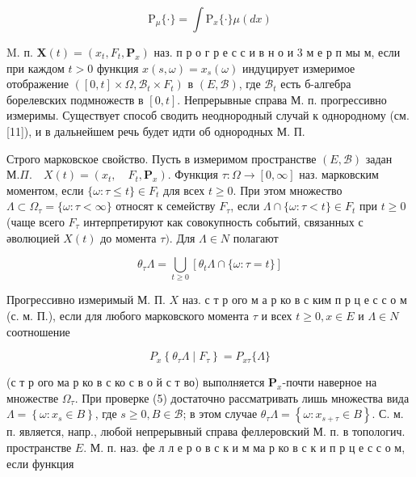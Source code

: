 \documentclass[10pt]{article}
\begin{document}
\[

\mathrm{P}_{\mu}\{\cdot\}=\int \mathrm{P}_{x}\{\cdot\} \mu(d x)

\]



M. п. $\boldsymbol{X}(t)=\left(x_{t}, F_{t}, \mathbf{P}_{x}\right)$ наз. п р о г р е с с и в н о и 3 м е р п мы м, если при каждом $t>0$ функция $x(s, \omega)=x_{s}(\omega)$ индуцирует измеримое отображение $\left([0, t] \times \Omega, \mathscr{B}_{t} \times F_{t}\right)$ в $(E, \mathscr{B})$, где $\mathscr{B}_{t}$ есть б-алгебра борелевских подмножеств в $[0, t]$. Непрерывные справа М. п. прогрессивно измеримы. Существует способ сводить неоднородный случай к однородному (см. [11]), и в дальнейшем речь будет идти об однородных М. П.



Строго марковское свойство. Пусть в измеримом пространстве $(E, \mathscr{B})$ задан $М . \Pi . \quad X(t)=\left(x_{t}, \quad F_{t}, \mathbf{P}_{x}\right)$. Функция $\tau: \Omega \rightarrow[0, \infty]$ наз. марковским моментом, если $\{\omega: \tau \leqslant t\} \in F_{t}$ для всех $t \geqslant 0$. При этом множество $\Lambda \subset \Omega_{\tau}=\{\omega: \tau<\infty\}$ относят к семейству $F_{\tau}$, если $\Lambda \cap\{\omega: \tau<t\} \in F_{t}$ при $t \geqslant 0$ (чаще всего $F_{\tau}$ интерпретируют как совокупность событий, связанных с әволюцией $X(t)$ до момента $\tau)$. Для $\Lambda \in N$ полагают



\[

\theta_{\tau} \Lambda=\bigcup_{t \geqslant 0}\left[\theta_{t} \Lambda \cap\{\omega: \tau=t\}\right]

\]



Прогрессивно измеримый М. П. $X$ наз. с т р ого м а р ко в с ким п р ц е с с о м (с. м. П.), если для любого марковского момента $\tau$ и всех $t \geqslant 0, x \in E$ и $\Lambda \in N$ соотношение



\[

P_{x}\left\{\theta_{\tau} \Lambda \mid F_{\tau}\right\}=P_{x \tau}\{\Lambda\}

\]



(с т р ого ма р ко в с ко с в о й с т во) выполняется $\mathbf{P}_{x}$-почти наверное на множестве $\Omega_{\tau}$. При проверке (5) достаточно рассматривать лишь множества вида $\Lambda=\left\{\omega: x_{s} \in B\right\}$, где $s \geqslant 0, B \in \mathscr{B}$; в этом случае $\theta_{\tau} \Lambda=\left\{\omega: x_{s+\tau} \in B\right\}$. С. м. п. является, напр., любой непрерывный справа феллеровский М. п. в топологич. пространстве $E$. М. п. наз. фе л л е р о в с к и м ма р ко в с к и п р ц е с с о м, если функция
\end{document}
